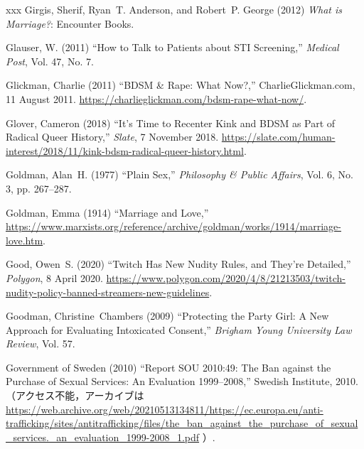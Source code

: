\documentclass[]{jlreq} \usepackage{mystyle}
\begin{document}
\begin{thebibliography}{xxx}
Girgis, Sherif, Ryan~T. Anderson, and Robert~P. George (2012)  \textit{ What is
  Marriage?}: Encounter Books.

Glauser, W. (2011) ``How to Talk to Patients about STI Screening,'' \textit{
  Medical Post}, Vol. 47, No. 7.

Glickman, Charlie (2011) ``BDSM \& Rape: What Now?,'' CharlieGlickman.com, 11
  August 2011. \url{https://charlieglickman.com/bdsm-rape-what-now/}.

Glover, Cameron (2018) ``It's Time to Recenter Kink and BDSM as Part of Radical
  Queer History,'' \emph{Slate}, 7 November 2018.
  \url{https://slate.com/human-interest/2018/11/kink-bdsm-radical-queer-history.html}.

Goldman, Alan~H. (1977) ``Plain Sex,'' \textit{ Philosophy \& Public Affairs},
  Vol. 6, No. 3, pp. 267--287.

Goldman, Emma (1914) ``Marriage and Love,''
  \url{https://www.marxists.org/reference/archive/goldman/works/1914/marriage-love.htm}.

Good, Owen~S. (2020) ``Twitch Has New Nudity Rules, and They're Detailed,''
  \emph{Polygon}, 8 April 2020.
  \url{https://www.polygon.com/2020/4/8/21213503/twitch-nudity-policy-banned-streamers-new-guidelines}.

Goodman, Christine~Chambers (2009) ``Protecting the Party Girl: A New Approach
  for Evaluating Intoxicated Consent,'' \textit{ Brigham Young University Law
  Review}, Vol. 57.

{Government of Sweden} (2010) ``Report {SOU} 2010:49: The Ban against the
  Purchase of Sexual Services: An Evaluation 1999--2008,'' Swedish Institute,
  2010.
  （アクセス不能，アーカイブは\url{https://web.archive.org/web/20210513134811/https://ec.europa.eu/anti-trafficking/sites/antitrafficking/files/the_ban_against_the_purchase_of_sexual_services._an_evaluation_1999-2008_1.pdf}
  ）.


\end{thebibliography}
\end{document}
